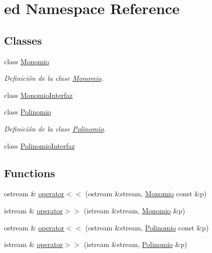 \hypertarget{namespaceed}{\section{ed Namespace Reference}
\label{namespaceed}
}
\subsection*{Classes}
\begin{DoxyCompactItemize}
\item 
class \hyperlink{classed_1_1Monomio}{Monomio}
\begin{DoxyCompactList}\small\item\em Definición de la clase \hyperlink{classed_1_1Monomio}{Monomio}. \end{DoxyCompactList}\item 
class \hyperlink{classed_1_1MonomioInterfaz}{Monomio\-Interfaz}
\item 
class \hyperlink{classed_1_1Polinomio}{Polinomio}
\begin{DoxyCompactList}\small\item\em Definición de la clase \hyperlink{classed_1_1Polinomio}{Polinomio}. \end{DoxyCompactList}\item 
class \hyperlink{classed_1_1PolinomioInterfaz}{Polinomio\-Interfaz}
\end{DoxyCompactItemize}
\subsection*{Functions}
\begin{DoxyCompactItemize}
\item 
ostream \& \hyperlink{namespaceed_a741b43394bfe10620139a91ae65bf93c}{operator$<$$<$} (ostream \&stream, \hyperlink{classed_1_1Monomio}{Monomio} const \&p)
\item 
istream \& \hyperlink{namespaceed_afe8742ffe980d202ce5c6d3bc9a0aea3}{operator$>$$>$} (istream \&stream, \hyperlink{classed_1_1Monomio}{Monomio} \&p)
\item 
ostream \& \hyperlink{namespaceed_a7e9c987335ee267d8c9d405a9b36b87f}{operator$<$$<$} (ostream \&stream, \hyperlink{classed_1_1Polinomio}{Polinomio} const \&p)
\item 
istream \& \hyperlink{namespaceed_adf08b7a71eb5c75b9a1032e42cbf3215}{operator$>$$>$} (istream \&stream, \hyperlink{classed_1_1Polinomio}{Polinomio} \&p)
\end{DoxyCompactItemize}


